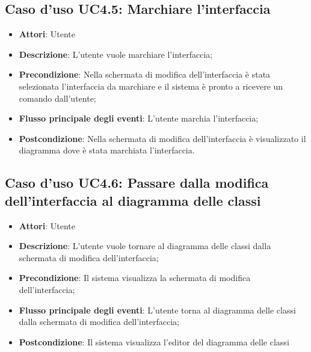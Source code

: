 \documentclass[../AnalisiDeiRequisiti.tex]{subfiles}
\begin{document}
			\subsection{Caso d'uso UC4.5: Marchiare l'interfaccia}
			\begin{itemize}
				\item \textbf{Attori}: Utente
				\item \textbf{Descrizione}: L'utente vuole marchiare l'interfaccia;
				\item \textbf{Precondizione}: Nella schermata di modifica dell'interfaccia è stata selezionata l'interfaccia da marchiare e il sistema è pronto a ricevere un comando dall'utente;
				\item \textbf{Flusso principale degli eventi}: L'utente marchia l'interfaccia;
				\item \textbf{Postcondizione}: Nella schermata di modifica dell'interfaccia è visualizzato il diagramma dove è stata marchiata l'interfaccia.
			\end{itemize}
			\subsection{Caso d'uso UC4.6: Passare dalla modifica dell'interfaccia al diagramma delle classi}
			\begin{itemize}
				\item \textbf{Attori}: Utente
				\item \textbf{Descrizione}: L'utente vuole tornare al diagramma delle classi dalla schermata di modifica dell'interfaccia;
				\item \textbf{Precondizione}: Il sistema visualizza la schermata di modifica dell'interfaccia;
				\item \textbf{Flusso principale degli eventi}: L'utente torna al diagramma delle classi dalla schermata di modifica dell'interfaccia;
				\item \textbf{Postcondizione}: Il sistema visualizza l'editor del diagramma delle classi
			\end{itemize}
\end{document}
